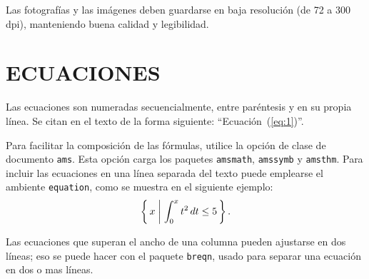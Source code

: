 \documentclass
  [ams,pdfout]%
	{aeslac}
\begin{document}
Las fotografías y las imágenes deben guardarse en baja resolución (de 72 a 300 dpi), manteniendo buena calidad y legibilidad.
%

\section{ECUACIONES}

Las ecuaciones son numeradas secuencialmente, entre paréntesis y en su propia línea. Se citan en el texto de la forma siguiente: ``Ecuación~(\ref{eq:1})''.

Para facilitar la composición de las fórmulas, utilice la opción de clase de documento \verb|ams|. Esta opción carga los paquetes \verb|amsmath|, \verb|amssymb| y \verb|amsthm|. Para incluir las ecuaciones en una línea separada del texto puede emplearse el ambiente \verb|equation|, como se muestra en el siguiente ejemplo:
\begin{equation}
\label{eq:1}
  \left\{\,
    x\biggm|\int_{0}^x t^{2}\,dt\leq5
  \,\right\}.
\end{equation}

Las ecuaciones que superan el ancho de una columna pueden ajustarse en dos líneas; eso se puede hacer con el paquete \verb|breqn|, usado para separar una ecuación en dos o mas líneas.

%
%
%
\end{document}
